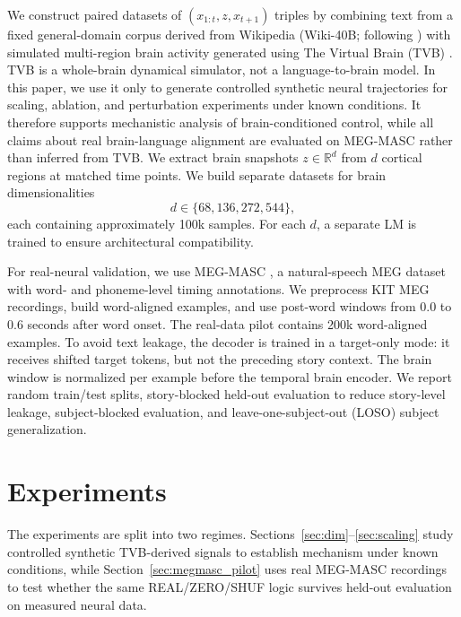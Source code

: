 \documentclass{article}
\theoremstyle{plain}
\theoremstyle{definition}
\theoremstyle{remark}
\begin{document}
We construct paired datasets of $(x_{1:t}, z, x_{t+1})$ triples by combining text from a fixed general-domain corpus derived from Wikipedia (Wiki-40B; following \cite{raffel2020t5}) with simulated multi-region brain activity generated using The Virtual Brain (TVB) \cite{schirner2022brain}.
TVB is a whole-brain dynamical simulator, not a language-to-brain model.
In this paper, we use it only to generate controlled synthetic neural trajectories for scaling, ablation, and perturbation experiments under known conditions.
It therefore supports mechanistic analysis of brain-conditioned control, while all claims about real brain-language alignment are evaluated on MEG-MASC rather than inferred from TVB.
We extract brain snapshots $z \in \mathbb{R}^d$ from $d$ cortical regions at matched time points.
We build separate datasets for brain dimensionalities
\[
d \in \{68, 136, 272, 544\},
\]
each containing approximately 100k samples.
For each $d$, a separate LM is trained to ensure architectural compatibility.

For real-neural validation, we use MEG-MASC \citep{gwilliams2023megmasc}, a natural-speech MEG dataset with word- and phoneme-level timing annotations.
We preprocess KIT MEG recordings, build word-aligned examples, and use post-word windows from $0.0$ to $0.6$ seconds after word onset.
The real-data pilot contains 200k word-aligned examples.
To avoid text leakage, the decoder is trained in a target-only mode: it receives shifted target tokens, but not the preceding story context.
The brain window is normalized per example before the temporal brain encoder.
We report random train/test splits, story-blocked held-out evaluation to reduce story-level leakage, subject-blocked evaluation, and leave-one-subject-out (LOSO) subject generalization.

\section{Experiments}
\label{sec:experiments}

The experiments are split into two regimes.
Sections~\ref{sec:dim}--\ref{sec:scaling} study controlled synthetic TVB-derived signals to establish mechanism under known conditions, while Section~\ref{sec:megmasc_pilot} uses real MEG-MASC recordings to test whether the same REAL/ZERO/SHUF logic survives held-out evaluation on measured neural data.
\end{document}
